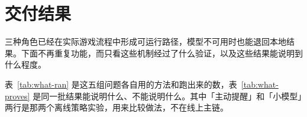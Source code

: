 \section{交付结果}

三种角色已经在实际游戏流程中形成可运行路径，模型不可用时也能退回本地结果。下面不再重复功能，而只看这些机制经过了什么验证，以及这些结果能说明到什么程度。\par\vspace{0.15em}

表~\ref{tab:what-ran} 是这五组问题各自用的方法和跑出来的数，表~\ref{tab:what-proves} 是同一批结果能说明什么、不能说明什么。其中「主动提醒」和「小模型」两行是那两个离线策略实验，用来比较做法，不在线上主链。\par\vspace{0.1em}

%
%
%
%
